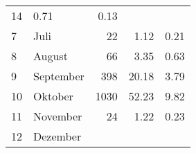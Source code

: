 \begin{longtable}{lXrrr}
       \num{14} &
       \num[round-mode=places,round-precision=2]{0.71} &
         \num[round-mode=places,round-precision=2]{0.13} \\

     7 &
     \multicolumn{1}{X}{ Juli   } &


       \num{22} &
       \num[round-mode=places,round-precision=2]{1.12} &
         \num[round-mode=places,round-precision=2]{0.21} \\

     8 &
     \multicolumn{1}{X}{ August   } &


       \num{66} &
       \num[round-mode=places,round-precision=2]{3.35} &
         \num[round-mode=places,round-precision=2]{0.63} \\

     9 &
     \multicolumn{1}{X}{ September   } &


       \num{398} &
       \num[round-mode=places,round-precision=2]{20.18} &
         \num[round-mode=places,round-precision=2]{3.79} \\

     10 &
     \multicolumn{1}{X}{ Oktober   } &


       \num{1030} &
       \num[round-mode=places,round-precision=2]{52.23} &
         \num[round-mode=places,round-precision=2]{9.82} \\

     11 &
     \multicolumn{1}{X}{ November   } &


       \num{24} &
       \num[round-mode=places,round-precision=2]{1.22} &
         \num[round-mode=places,round-precision=2]{0.23} \\

     12 &
     \multicolumn{1}{X}{ Dezember   } &



\end{longtable}
